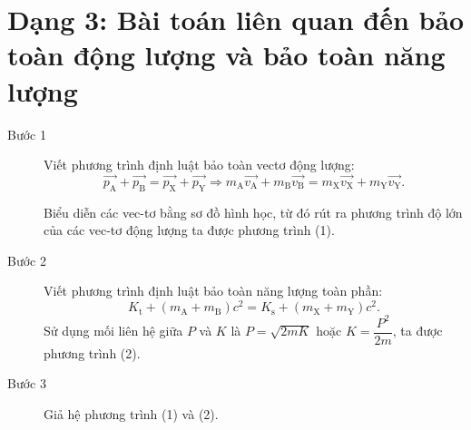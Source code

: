 \section{Dạng 3: Bài toán liên quan đến bảo toàn động lượng và bảo toàn năng lượng}
\begin{description}
	\item[Bước 1] Viết phương trình định luật bảo toàn vectơ động lượng:
	\begin{equation*}
		\vec{p_{\text{A}}}+ \vec{p_{\text{B}}} = \vec{p_{\text{X}}} + \vec{p_{\text{Y}}} \Rightarrow m_{\text{A}} \vec{v_{\text{A}}} +m_{\text{B}} \vec{v_{\text{B}}} = m_{\text{X}} \vec{v_{\text{X}}} + m_{\text{Y}} \vec{v_{\text{Y}}}.
	\end{equation*}
	
	Biểu diễn các vec-tơ bằng sơ đồ hình học, từ đó rút ra phương trình độ lớn của các vec-tơ động lượng ta được phương trình (1).
	\item [Bước 2] Viết phương trình định luật bảo toàn năng lượng toàn phần:
	\begin{equation*}
		K_{\text{t}}+ (m_{\text{A}}+ m_{\text{B}})c^2 = K_{\text{s}} + (m_{\text{X}} + m_{\text{Y}})c^2.
	\end{equation*}
	Sử dụng mối liên hệ giữa $P$ và $K$ là $P=\sqrt{2mK}$ hoặc $K=\dfrac{P^2}{2m}$, ta được phương trình (2).
	\item [Bước 3] Giả hệ phương trình (1) và (2).
\end{description}

